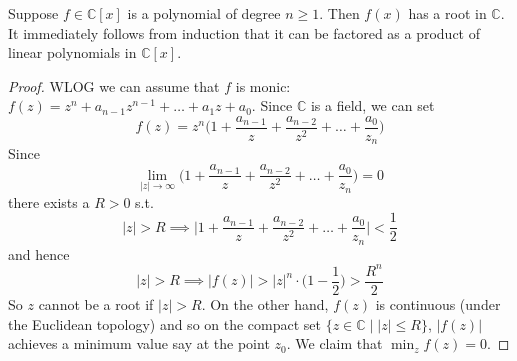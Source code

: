   \begin{theorem}
    Suppose $f \in \mathbb{C}[x]$ is a polynomial of degree $n \geq 1$. Then $f(x)$ has a root in $\mathbb{C}$. It immediately follows from induction that it can be factored as a product of linear polynomials in $\mathbb{C}[x]$. 
  \end{theorem}
  \begin{proof}
    WLOG we can assume that $f$ is monic: $f(z) = z^n + a_{n-1} z^{n-1} + \ldots + a_1 z + a_0$. Since $\mathbb{C}$ is a field, we can set 
    \begin{equation}
      f(z) = z^n \bigg( 1 + \frac{a_{n-1}}{z} + \frac{a_{n-2}}{z^2} + \ldots + \frac{a_0}{z_n} \bigg)
    \end{equation} 
    Since 
    \begin{equation}
      \lim_{|z| \rightarrow \infty} \bigg( 1 + \frac{a_{n-1}}{z} + \frac{a_{n-2}}{z^2} + \ldots + \frac{a_0}{z_n} \bigg) = 0
    \end{equation}
    there exists a $R > 0$ s.t. 
    \begin{equation}
      |z| > R \implies \bigg| 1 + \frac{a_{n-1}}{z} + \frac{a_{n-2}}{z^2} + \ldots + \frac{a_0}{z_n} \bigg| < \frac{1}{2}
    \end{equation}
    and hence 
    \begin{equation}
      |z| > R \implies |f(z)| > |z|^n \cdot \bigg( 1 - \frac{1}{2} \bigg) > \frac{R^n}{2}
    \end{equation}
    So $z$ cannot be a root if $|z| > R$. On the other hand, $f(z)$ is continuous (under the Euclidean topology) and so on the compact set $\{z \in \mathbb{C} \mid |z| \leq R\}$, $|f(z)|$ achieves a minimum value say at the point $z_0$. We claim that $\min_z f(z) = 0$. 


\end{proof}
